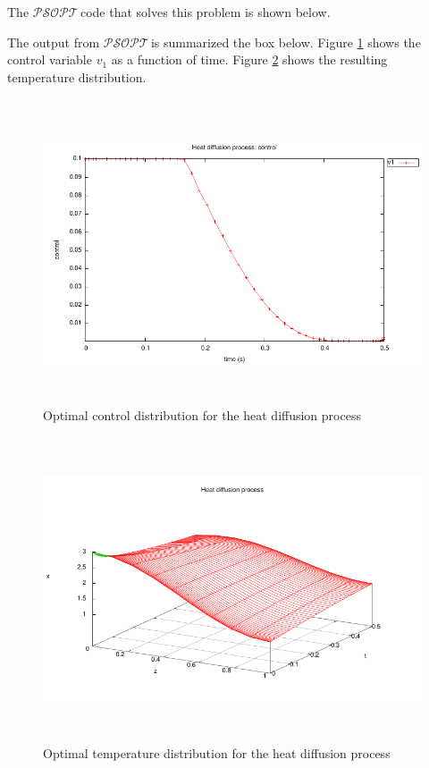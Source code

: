 \documentclass[a4paper,11pt]{report}    %
\newcommand{\psopt}{$\mathcal{PSOPT}$\,}  %
\newenvironment{shadedframe}{%
  \def\FrameCommand{\fcolorbox{black}{shadecolor}}%
  \MakeFramed {\FrameRestore}}
{\endMakeFramed}
\begin{document}
The
\psopt code that solves this problem is shown below.  

\tiny
\begin{shadedframe}

\end{shadedframe}
\normalsize

The output from \psopt is summarized the box below.  Figure \ref{heat_control} 
shows the control variable $v_1$ as a function of time.
Figure \ref{heat_surf} 
shows the resulting temperature distribution.

\begin{shadedframe}

\end{shadedframe}


\begin{figure}[htbp]
 \centerline{\includegraphics[height=9cm]{../examples/heat/heat_control}}
 \caption{Optimal control distribution for the heat diffusion process}
\label{heat_control}
\end{figure}



\begin{figure}[htbp]
 \centerline{\includegraphics[height=9cm]{../examples/heat/heat_surf}}
\caption{Optimal temperature distribution for the heat diffusion process}
\label{heat_surf}
\end{figure}
\end{document}
